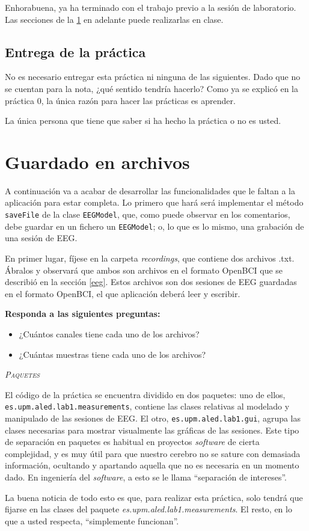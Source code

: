 \documentclass[10pt,a4paper,spanish]{article}
\newcommand{\sombreado}[2]{
  \begin{shaded}
    \begin{center} \emph{\textsc{#1}} \end{center}
    \noindent #2\\
  \end{shaded}
}
\newcommand{\code}[1]{\texttt{#1}}
\begin{document}
Enhorabuena, ya ha terminado con el trabajo previo a la sesión de laboratorio. Las secciones de la \ref{laboratorio} en adelante puede realizarlas en clase.

\subsection{Entrega de la práctica}

No es necesario entregar esta práctica ni ninguna de las siguientes. Dado que no se cuentan para la nota, ¿qué sentido tendría hacerlo? Como ya se explicó en la práctica 0, la única razón para hacer las prácticas es aprender.

La única persona que tiene que saber si ha hecho la práctica o no es usted.

\section{Guardado en archivos}
\label{laboratorio}

A continuación va a acabar de desarrollar las funcionalidades que le faltan a la aplicación para estar completa. Lo primero que hará será implementar el método \code{saveFile} de la clase \code{EEGModel}, que, como puede observar en los comentarios, debe guardar en un fichero un \code{EEGModel}; o, lo que es lo mismo, una grabación de una sesión de EEG.

En primer lugar, fíjese en la carpeta \textit{recordings}, que contiene dos archivos .txt. Ábralos y observará que ambos son archivos en el formato OpenBCI que se describió en la sección \ref{eeg}. Estos archivos son dos sesiones de EEG guardadas en el formato OpenBCI, el que aplicación deberá leer y escribir.

\textbf{Responda a las siguientes preguntas:}

\begin{itemize}
    \item ¿Cuántos canales tiene cada uno de los archivos?
    \item ¿Cuántas muestras tiene cada uno de los archivos?
\end{itemize}

\sombreado{Paquetes}{El código de la práctica se encuentra dividido en dos paquetes: uno de ellos, \code{es.upm.aled.lab1.measurements}, contiene las clases relativas al modelado y manipulado de las sesiones de EEG. El otro, \code{es.upm.aled.lab1.gui}, agrupa las clases necesarias para mostrar visualmente las gráficas de las sesiones. Este tipo de separación en paquetes es habitual en proyectos \textit{software} de cierta complejidad, y es muy útil para que nuestro cerebro no se sature con demasiada información, ocultando y apartando aquella que no es necesaria en un momento dado. En ingeniería del \textit{software}, a esto se le llama ``separación de intereses''.

La buena noticia de todo esto es que, para realizar esta práctica, solo tendrá que fijarse en las clases del paquete \textit{es.upm.aled.lab1.measurements}. El resto, en lo que a usted respecta, ``simplemente funcionan''.}
\end{document}
